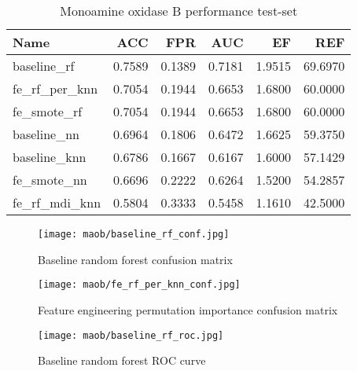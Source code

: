 \begin{table}[H]
    \begin{center}
        \caption{Monoamine oxidase B performance test-set}
        \begin{tabular}{lrrrrr}
            \toprule
            Name             & ACC    & FPR    & AUC    & EF     & REF     \\
            \midrule
            baseline\_rf     & 0.7589 & 0.1389 & 0.7181 & 1.9515 & 69.6970 \\
            fe\_rf\_per\_knn & 0.7054 & 0.1944 & 0.6653 & 1.6800 & 60.0000 \\
            fe\_smote\_rf    & 0.7054 & 0.1944 & 0.6653 & 1.6800 & 60.0000 \\
            baseline\_nn     & 0.6964 & 0.1806 & 0.6472 & 1.6625 & 59.3750 \\
            baseline\_knn    & 0.6786 & 0.1667 & 0.6167 & 1.6000 & 57.1429 \\
            fe\_smote\_nn    & 0.6696 & 0.2222 & 0.6264 & 1.5200 & 54.2857 \\
            fe\_rf\_mdi\_knn & 0.5804 & 0.3333 & 0.5458 & 1.1610 & 42.5000 \\
            \bottomrule
        \end{tabular}
    \end{center}
\end{table}

\begin{figure}[H]
    \begin{center}
        \caption[]{Baseline random forest confusion matrix}
        \label{fig:maob_baseline_rf_conf}
        \texttt{[image: maob/baseline\_rf\_conf.jpg]}
    \end{center}
\end{figure}

\begin{figure}[H]
    \begin{center}
        \caption[]{Feature engineering permutation importance confusion matrix}
        \label{fig:maob_fe_rf_per_knn_conf}
        \texttt{[image: maob/fe\_rf\_per\_knn\_conf.jpg]}
    \end{center}

\end{figure}

\begin{figure}[H]
    \begin{center}
        \caption[]{Baseline random forest ROC curve}
        \label{fig:maob_baseline_rf_roc}
        \texttt{[image: maob/baseline\_rf\_roc.jpg]}
    \end{center}

\end{figure}

